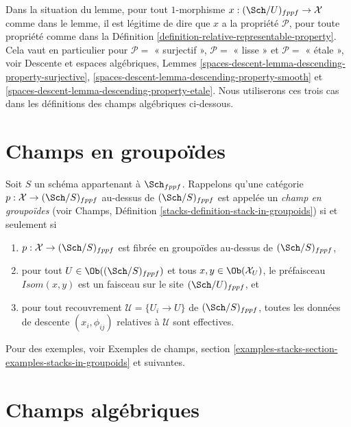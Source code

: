 \noindent
Dans la situation du lemme, pour tout $1$-morphisme
$x : (\Sch/U)_{fppf} \to \mathcal{X}$ comme dans le lemme, il est légitime
de dire que $x$ a la propriété $\mathcal{P}$, pour toute propriété comme dans la
Définition \ref{definition-relative-representable-property}.
Cela vaut en particulier pour
$\mathcal{P} = $ « surjectif »,
$\mathcal{P} = $ « lisse » et
$\mathcal{P} = $ « \'etale »,
voir
Descente et espaces algébriques,
Lemmes \ref{spaces-descent-lemma-descending-property-surjective},
\ref{spaces-descent-lemma-descending-property-smooth} et
\ref{spaces-descent-lemma-descending-property-etale}.
Nous utiliserons ces trois cas dans les définitions
des champs algébriques ci-dessous.








\section{Champs en groupoïdes}
\label{section-stacks}

\noindent
Soit $S$ un schéma appartenant à $\Sch_{fppf}$.
Rappelons qu'une catégorie $p : \mathcal{X} \to (\Sch/S)_{fppf}$
au-dessus de $(\Sch/S)_{fppf}$ est appelée un
{\it champ en groupoïdes} (voir
Champs, Définition \ref{stacks-definition-stack-in-groupoids})
si et seulement si
\begin{enumerate}
\item $p : \mathcal{X} \to (\Sch/S)_{fppf}$ est fibrée
en groupoïdes au-dessus de $(\Sch/S)_{fppf}$,
\item pour tout $U \in \Ob((\Sch/S)_{fppf})$ et
tous $x, y\in \Ob(\mathcal{X}_U)$, le préfaisceau
$\mathit{Isom}(x, y)$ est un faisceau sur le site $(\Sch/U)_{fppf}$, et
\item pour tout recouvrement $\mathcal{U} = \{U_i \to U\}$ de
$(\Sch/S)_{fppf}$, toutes les données de descente $(x_i, \phi_{ij})$
relatives à $\mathcal{U}$ sont effectives.
\end{enumerate}
Pour des exemples, voir
Exemples de champs,
section \ref{examples-stacks-section-examples-stacks-in-groupoids}
et suivantes.










\section{Champs algébriques}
\label{section-algebraic-stacks}


